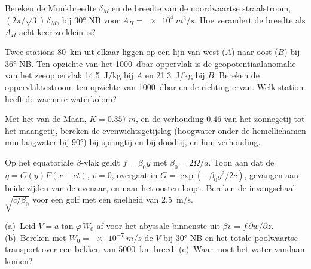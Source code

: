 \begin{exercise}[$\star\star$]\label{exo:b3:ocean-dynamics:7}
Bereken de Munkbreedte $\delta_M$ en de breedte van de noordwaartse straalstroom,
$(2\pi/\sqrt3)\,\delta_M$, bij \ang{30} NB voor $A_H = \qty{e4}{m^2/s}$. Hoe
verandert de breedte als $A_H$ acht keer zo klein is?
\end{exercise}

\begin{exercise}[$\star\star$]\label{exo:b3:ocean-dynamics:8}
Twee stations \qty{80}{km} uit elkaar liggen op een lijn van west ($A$) naar oost
($B$) bij \ang{36} NB. Ten opzichte van het \qty{1000}{dbar}-oppervlak is de
geopotentiaalanomalie van het zeeoppervlak \qty{14.5}{J/kg} bij $A$ en
\qty{21.3}{J/kg} bij $B$. Bereken de oppervlaktestroom ten opzichte van
\qty{1000}{dbar} en de richting ervan. Welk station heeft de
warmere waterkolom?
\end{exercise}

\begin{exercise}[$\star\star$]\label{exo:b3:ocean-dynamics:9}
Met het  van de Maan, $K = \qty{0.357}{m}$, en de verhouding
\num{0.46} van het zonnegetij tot het maangetij, bereken de evenwichtsgetijslag
(hoogwater onder de hemellichamen min laagwater bij \ang{90}) bij springtij en bij
doodtij, en hun verhouding.
\end{exercise}

\begin{exercise}[$\star\star\star$]\label{exo:b3:ocean-dynamics:10}
Op het equatoriale $\beta$-vlak geldt $f = \beta_0y$ met $\beta_0 =
2\Omega/a$. Toon aan dat de  $\eta = G(y)F(x - ct)$, $v = 0$,
overgaat in $G = \exp(-\beta_0y^2/2c)$, gevangen aan beide zijden van de evenaar,
en naar het oosten loopt. Bereken de invangschaal $\sqrt{c/\beta_0}$ voor een
golf met een snelheid van \qty{2.5}{m/s}.
\end{exercise}

\begin{exercise}[$\star\star\star$]\label{exo:b3:ocean-dynamics:11}
(a)~Leid $V = a\tan\varphi\,W_0$ af voor het abyssale binnenste uit $\beta v =
f\,\partial w/\partial z$. (b)~Bereken met $W_0 = \qty{e-7}{m/s}$ de $V$ bij
\ang{30} NB en het totale poolwaartse transport over een bekken van
\qty{5000}{km} breed. (c)~Waar moet het water vandaan komen?
\end{exercise}

